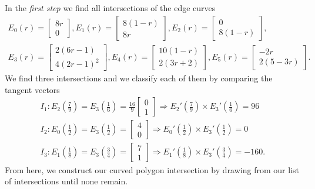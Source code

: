 \documentclass[oneside, reqno]{amsart}
\theoremstyle{definition}
\begin{document}
In the \emph{first step} we find all intersections of the
edge curves
\begin{multline}
E_0(r) = \left[ \begin{array}{c} 8 r \\ 0 \end{array}\right],
E_1(r) = \left[ \begin{array}{c} 8 (1 - r) \\ 8 r \end{array}\right],
E_2(r) = \left[ \begin{array}{c} 0 \\ 8 (1 - r) \end{array}\right], \\
E_3(r) = \left[ \begin{array}{c} 2 (6 r - 1) \\ 4 (2 r - 1)^2
  \end{array}\right],
E_4(r) = \left[ \begin{array}{c} 10 (1 - r) \\ 2 (3 r + 2) \end{array}\right],
E_5(r) = \left[ \begin{array}{c} - 2 r \\ 2 (5 - 3 r) \end{array}\right].
\end{multline}
We find three intersections
and we classify each of them by comparing the tangent vectors
\begin{gather}
  I_1:
  E_2\left(\frac{7}{9}\right) =
E_3\left(\frac{1}{6}\right) = \frac{16}{9}
\left[ \begin{array}{c} 0 \\ 1 \end{array}\right] \Longrightarrow
E_2'\left(\frac{7}{9}\right) \times
E_3'\left(\frac{1}{6}\right) = 96 \\
I_2:
E_0\left(\frac{1}{2}\right) =
E_3\left(\frac{1}{2}\right) =
\left[ \begin{array}{c} 4 \\ 0 \end{array}\right] \Longrightarrow
E_0'\left(\frac{1}{2}\right) \times
E_3'\left(\frac{1}{2}\right) = 0 \\
  I_3:
E_1\left(\frac{1}{8}\right) =
E_3\left(\frac{3}{4}\right) =
\left[ \begin{array}{c} 7 \\ 1 \end{array}\right] \Longrightarrow
E_1'\left(\frac{1}{8}\right) \times
E_3'\left(\frac{3}{4}\right) = -160.
\end{gather}
From here, we construct our curved polygon intersection by drawing
from our list of intersections until none remain.
\end{document}
